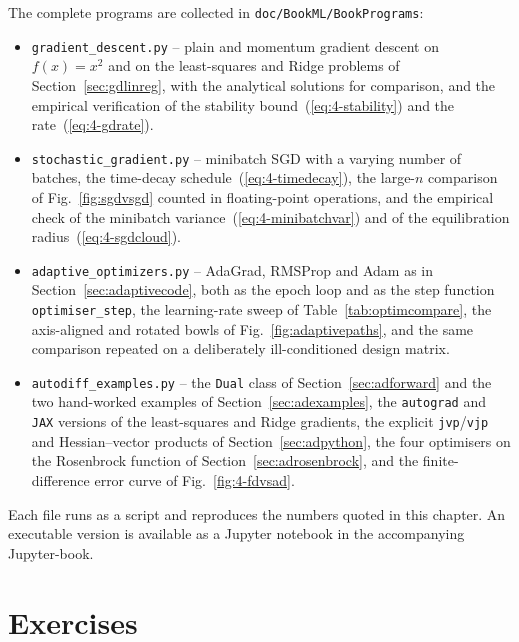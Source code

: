 The complete programs are collected in \texttt{doc/BookML/BookPrograms}:

\begin{itemize}
  \item \texttt{gradient\_descent.py} -- plain and momentum gradient descent on
        $f(x)=x^{2}$ and on the least-squares and Ridge problems of
        Section~\ref{sec:gdlinreg}, with the analytical solutions for
        comparison, and the empirical verification of the stability
        bound~(\ref{eq:4-stability}) and the rate~(\ref{eq:4-gdrate}).
  \item \texttt{stochastic\_gradient.py} -- minibatch SGD with a varying number
        of batches, the time-decay schedule~(\ref{eq:4-timedecay}), the
        large-$n$ comparison of Fig.~\ref{fig:sgdvsgd} counted in
        floating-point operations, and the empirical check of the minibatch
        variance~(\ref{eq:4-minibatchvar}) and of the equilibration
        radius~(\ref{eq:4-sgdcloud}).
  \item \texttt{adaptive\_optimizers.py} -- AdaGrad, RMSProp and Adam as in
        Section~\ref{sec:adaptivecode}, both as the epoch loop and as the
        step function \texttt{optimiser\_step}, the learning-rate sweep of
        Table~\ref{tab:optimcompare}, the axis-aligned and rotated bowls of
        Fig.~\ref{fig:adaptivepaths}, and the same comparison repeated on a
        deliberately ill-conditioned design matrix.
  \item \texttt{autodiff\_examples.py} -- the \texttt{Dual} class of
        Section~\ref{sec:adforward} and the two hand-worked examples of
        Section~\ref{sec:adexamples}, the \texttt{autograd} and \texttt{JAX}
        versions of the least-squares and Ridge gradients, the explicit
        \texttt{jvp}/\texttt{vjp} and Hessian--vector products of
        Section~\ref{sec:adpython}, the four optimisers on the Rosenbrock
        function of Section~\ref{sec:adrosenbrock}, and the finite-difference
        error curve of Fig.~\ref{fig:4-fdvsad}.
\end{itemize}

Each file runs as a script and reproduces the numbers quoted in this chapter.
An executable version is available as a Jupyter notebook in the accompanying
Jupyter-book.

\section{Exercises}
\label{sec:ch4exercises}

